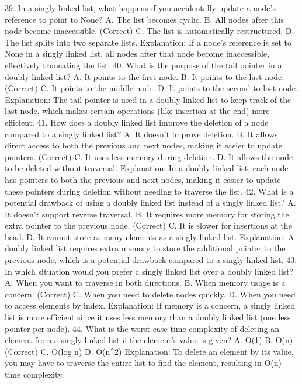 39. In a singly linked list, what happens if you accidentally update a node's reference to point to None?
A. The list becomes cyclic.
B. All nodes after this node become inaccessible. (Correct)
C. The list is automatically restructured.
D. The list splits into two separate lists.
Explanation: If a node's reference is set to None in a singly linked list, all nodes after that node become inaccessible, effectively truncating the list.
40. What is the purpose of the tail pointer in a doubly linked list?
A. It points to the first node.
B. It points to the last node. (Correct)
C. It points to the middle node.
D. It points to the second-to-last node.
Explanation: The tail pointer is used in a doubly linked list to keep track of the last node, which makes certain operations (like insertion at the end) more efficient.
41. How does a doubly linked list improve the deletion of a node compared to a singly linked list?
A. It doesn't improve deletion.
B. It allows direct access to both the previous and next nodes, making it easier to update pointers. (Correct)
C. It uses less memory during deletion.
D. It allows the node to be deleted without traversal.
Explanation: In a doubly linked list, each node has pointers to both the previous and next nodes, making it easier to update these pointers during deletion without needing to traverse the list.
42. What is a potential drawback of using a doubly linked list instead of a singly linked list?
A. It doesn't support reverse traversal.
B. It requires more memory for storing the extra pointer to the previous node. (Correct)
C. It is slower for insertions at the head.
D. It cannot store as many elements as a singly linked list.
Explanation: A doubly linked list requires extra memory to store the additional pointer to the previous node, which is a potential drawback compared to a singly linked list.
43. In which situation would you prefer a singly linked list over a doubly linked list?
A. When you want to traverse in both directions.
B. When memory usage is a concern. (Correct)
C. When you need to delete nodes quickly.
D. When you need to access elements by index.
Explanation: If memory is a concern, a singly linked list is more efficient since it uses less memory than a doubly linked list (one less pointer per node).
44. What is the worst-case time complexity of deleting an element from a singly linked list if the element’s value is given?
A. O(1)
B. O(n) (Correct)
C. O(log n)
D. O(n^2)
Explanation: To delete an element by its value, you may have to traverse the entire list to find the element, resulting in O(n) time complexity.
